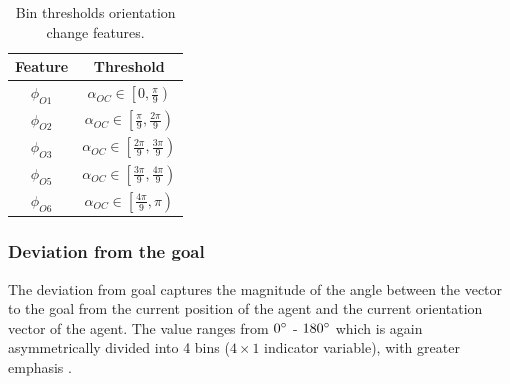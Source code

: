 \begin{table}[!htbp]

    \begin{center}
        \renewcommand{\arraystretch}{1.3}
        \begin{tabular}{|c|c|}
            \hline
            \textbf{Feature} & \textbf{Threshold} \\
            \hline
            $\phi_{O1}$ & $\alpha_{OC} \in \left[ 0 , \frac{\pi}{9} \right)$ \\
            
            $\phi_{O2}$ & $\alpha_{OC} \in \left[ \frac{\pi}{9} , \frac{2\pi}{9} \right)$ \\
            
            $\phi_{O3}$ & $\alpha_{OC} \in \left[ \frac{2\pi}{9} , \frac{3\pi}{9} \right)$ \\
    
            
            $\phi_{O5}$ & $\alpha_{OC} \in \left[ \frac{3\pi}{9} , \frac{4\pi}{9} \right)$ \\
            
            $\phi_{O6}$ & $\alpha_{OC} \in \left[ \frac{4\pi}{9} , \pi \right)$ \\
            \hline
        \end{tabular}
        \caption{Bin thresholds orientation change features.}
    \label{tab:orientation-change-bins}
    \end{center}
\end{table}
\subsubsection*{Deviation from the goal}
The deviation from goal captures the magnitude of the angle between the vector to the goal from the current position of the agent and the current orientation vector of the agent. The value ranges from $0 \degree$ - $ 180 \degree$ which is again asymmetrically divided into 4 bins ($4 \times 1$ indicator variable), with greater emphasis . 

